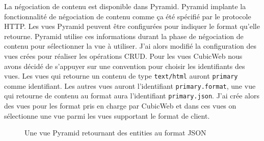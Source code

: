 La négociation de contenu est disponible dans Pyramid. Pyramid implante la fonctionnalité de négociation de contenu comme ça été spécifié par le protocole HTTP. Les vues Pyramid peuvent être configurées pour indiquer le format qu'elle retourne. Pyramid utilise ces informations durant la phase de négociation de contenu pour sélectionner la vue à utiliser. J'ai alors modifié la configuration des vues crées pour réaliser les opérations CRUD. Pour les vues CubicWeb nous avons décidé de s'appuyer sur une convention pour choisir les identifiants des vues. Les vues qui retourne un contenu de type \texttt{text/html} auront \texttt{primary} comme identifiant. Les autres vues auront l'identifiant \texttt{primary.format}, une vue qui retourne de contenu au format  aura l'identifiant \texttt{primary.json}. J'ai crée alors des vues pour les format pris en charge par CubicWeb et dans ces vues on sélectionne une vue parmi les vues supportant le format de client.   


\begin{figure}[htp]
    \centering
    \caption{Une vue Pyramid retournant des entities au format JSON}
    \label{fig:getjson}
\end{figure}
